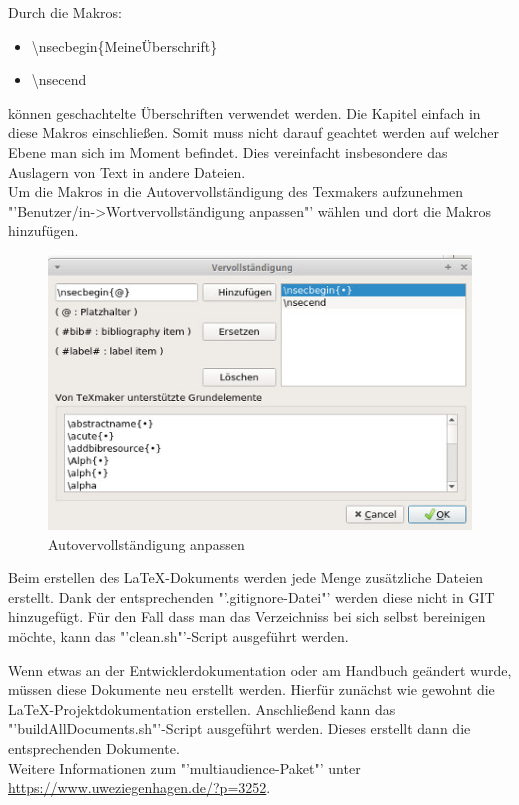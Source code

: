 Durch die Makros:
\begin{itemize}
\item \textbackslash nsecbegin\{MeineÜberschrift\}
\item \textbackslash nsecend
\end{itemize}
können geschachtelte Überschriften verwendet werden. Die Kapitel einfach in diese Makros einschließen. Somit muss nicht darauf geachtet werden auf welcher Ebene man sich im Moment befindet. Dies vereinfacht insbesondere das Auslagern von Text in andere Dateien.\\
Um die Makros in die Autovervollständigung des Texmakers aufzunehmen "'Benutzer/in->Wortvervollständigung anpassen"' wählen und dort die Makros hinzufügen.
\begin{figure}[hbtp]
\centering
\includegraphics[scale=0.4]{Bilder/autocompleteMakro}
\caption{Autovervollständigung anpassen}
\end{figure}
\nsecend

Beim erstellen des LaTeX-Dokuments werden jede Menge zusätzliche Dateien erstellt. Dank der entsprechenden "'.gitignore-Datei"' werden diese nicht in GIT hinzugefügt. Für den Fall dass man das Verzeichniss bei sich selbst bereinigen möchte, kann das "'clean.sh"'-Script ausgeführt werden.
\nsecend

Wenn etwas an der Entwicklerdokumentation oder am Handbuch geändert wurde, müssen diese Dokumente neu erstellt werden. Hierfür zunächst wie gewohnt die LaTeX-Projektdokumentation erstellen. Anschließend kann das "'buildAllDocuments.sh"'-Script ausgeführt werden. Dieses erstellt dann die entsprechenden Dokumente.\\
Weitere Informationen zum "'multiaudience-Paket"' unter \url{https://www.uweziegenhagen.de/?p=3252}.
\nsecend
\nsecend %


